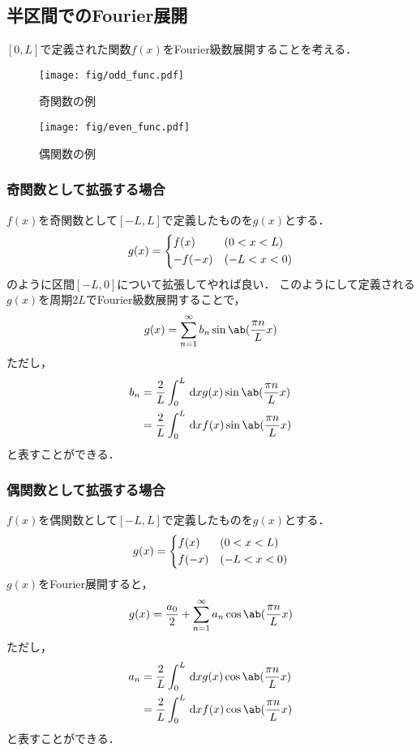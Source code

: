 \subsection{半区間でのFourier展開}
$[0, L]$で定義された関数$f(x)$をFourier級数展開することを考える．
\begin{figure}[htbp]%
  \centering%
  \begin{minipage}{0.47\linewidth}
    \centering
    \texttt{[image: fig/odd\_func.pdf]}%
    \caption{奇関数の例}
  \end{minipage}
  \begin{minipage}{0.47\linewidth}
    \centering
    \texttt{[image: fig/even\_func.pdf]}%
    \caption{偶関数の例}
  \end{minipage}
\end{figure}%
\subsubsection{奇関数として拡張する場合}
$f(x)$を奇関数として$[-L, L]$で定義したものを$g(x)$とする．
\begin{gather}  
  g(x) = 
  \begin{dcases}
    f(x) & (0 < x < L)\\
    -f(-x) & (-L<x<0)
  \end{dcases}
\end{gather}
のように区間$[-L, 0]$について拡張してやれば良い．
このようにして定義される$g(x)$を周期$2L$でFourier級数展開することで，
\begin{gather}
  g(x) = \sum_{n=1}^\infty b_n \sin\ab(\frac{\pi n}{L}x)
\end{gather}
ただし，
\begin{align}  
  b_n &= \frac{2}{L} \int_0^L \dl{x} g(x)\sin\ab(\frac{\pi n}{L}x)\\
      &= \frac{2}{L}\int_0^L \dl{x}f(x) \sin\ab(\frac{\pi n}{L} x)
\end{align}
と表すことができる．
\subsubsection{偶関数として拡張する場合}
$f(x)$を偶関数として$[-L, L]$で定義したものを$g(x)$とする．
\begin{gather}  
  g(x) = 
  \begin{dcases}
    f(x) & (0 < x < L)\\
    f(-x) & (-L<x<0)
  \end{dcases}
\end{gather}
$g(x)$をFourier展開すると，
\begin{gather}
  g(x) = \frac{a_0}{2} + \sum_{n=1}^\infty a_n \cos\ab(\frac{\pi n}{L}x)
\end{gather}
ただし，
\begin{align}  
  a_n &= \frac{2}{L} \int_0^L \dl{x} g(x) \cos\ab(\frac{\pi n}{L} x)\\
      &= \frac{2}{L} \int_0^L \dl{x} f(x) \cos\ab(\frac{\pi n}{L} x)
\end{align}
と表すことができる．

